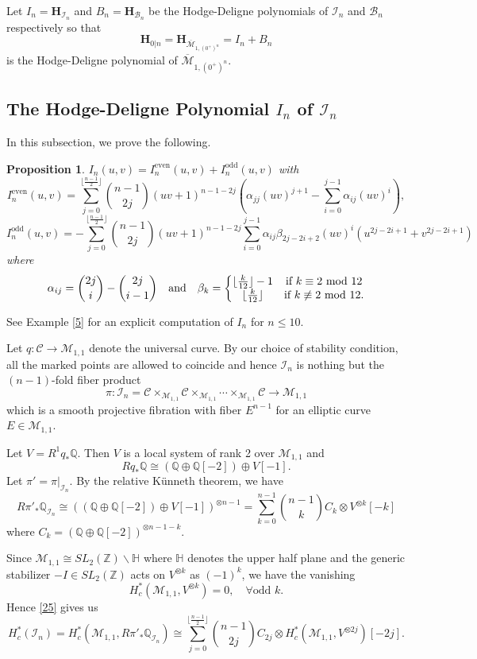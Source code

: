 \documentclass[11pt]{amsart}
\numberwithin{equation}{section}
\newtheorem{prop}[theo]{Proposition}
\theoremstyle{definition}
\newcommand{\QQ}{\mathbb{Q}}
\newcommand{\ZZ}{\mathbb{Z}}
\newcommand{\HH}{\mathbb{H}}
\newcommand{\bH}{\mathbf{H}}
\def\cB{{\mathcal B}}
\def\cC{{\mathcal C}}
\def\cM{{\mathcal M}}
\def\cI{{\mathcal I}}
\def\and{\quad{\rm and}\quad}
\def\lra{\longrightarrow }
\def\beq{\begin{equation}}
\def\eeq{\end{equation}}
\def\bcM{\overline{\cM}}
\begin{document}
Let $I_n=\bH_{\cI_n}$ and $B_n=\bH_{\cB_n}$ be the Hodge-Deligne polynomials of $\cI_n$ and $\cB_n$ respectively so that 
$$\bH_{0|n}= \bH_{\bcM_{1,(0^+)^n}}=I_n+B_n $$
is the Hodge-Deligne polynomial of $\bcM_{1,(0^+)^n}$.

\subsection{The Hodge-Deligne Polynomial $I_n$ of $\cI_n$} 
In this subsection, we prove the following. 
\begin{prop}\label{3} $I_n(u,v)=I_n^{\mathrm{even}}(u,v)+I^{\mathrm{odd}}_n(u,v)$ with  
\[
I_n^{\mathrm{even}}(u,v) = 
\sum_{j=0}^{\lfloor\frac{n-1}{2}\rfloor} \binom{n-1}{2j} (uv+1)^{n-1-2j} \left( \alpha_{jj}(uv)^{j+1} - \sum_{i=0}^{j-1} \alpha_{ij}(uv)^i\right),
\]
\[I_n^{\mathrm{odd}}(u,v)=-\sum_{j=0}^{\lfloor\frac{n-1}{2}\rfloor} \binom{n-1}{2j} (uv+1)^{n-1-2j}  \sum_{i=0}^{j-1} \alpha_{ij}\beta_{2j-2i+2}(uv)^i(u^{2j-2i+1}+v^{2j-2i+1})  \]
where \beq\label{21} \alpha_{ij}=\binom{2j}{i}-\binom{2j}{i-1}
\and 
\beta_k=\left\{\begin{matrix}  \lfloor \frac{k}{12}\rfloor -1 & \text{if } k\equiv 2 \text{ mod } 12\\
\lfloor \frac{k}{12}\rfloor & \text{if } k\not\equiv 2 \text{ mod } 12 .\end{matrix}\right.
\eeq
\end{prop}
See Example \ref{5} for an explicit computation of $I_n$ for $n\le 10$. 

\medskip

Let $q:\cC\to \cM_{1,1}$ denote the universal curve.
By our choice of stability condition, all the marked points are allowed to coincide and hence $\cI_n$ is nothing but the $(n-1)$-fold fiber product 
$$\pi:\cI_n=\cC\times_{\cM_{1,1}}\cC\times_{\cM_{1,1}}\cdots\times_{\cM_{1,1}}\cC\lra \cM_{1,1}$$
which is a smooth projective fibration with fiber $E^{n-1}$ for an elliptic curve $E\in \cM_{1,1}$.  

Let $V=R^1q_*\QQ$. Then $V$ is a local system of rank 2 over $\cM_{1,1}$ and $$Rq_*\QQ\cong (\QQ\oplus\QQ[-2])\oplus V[-1].$$ 
Let $\pi'=\pi|_{\cI_n}$. By the relative K\"unneth theorem, we have 
\beq\label{25}
R\pi'_*\QQ_{\cI_n}\cong ((\QQ\oplus \QQ[-2])\oplus V[-1])^{\otimes n-1}
=\sum_{k=0}^{n-1} \binom{n-1}{k} C_k\otimes V^{\otimes k}[-k]
\eeq
where $C_k=(\QQ\oplus \QQ[-2])^{\otimes n-1-k}$.

Since $\cM_{1,1}\cong SL_2(\ZZ)\backslash \HH$ where $\HH$ denotes the upper half plane and the generic stabilizer $-I\in SL_2(\ZZ)$ acts on $V^{\otimes k}$ as $(-1)^k$, we have the vanishing 
$$H^*_c(\cM_{1,1},V^{\otimes k})=0, \quad \forall \text{odd } k.$$  
Hence \eqref{25} gives us
\beq\label{26}
H^*_c(\cI_n)=H^*_c(\cM_{1,1},R\pi'_*\QQ_{\cI_n})
\cong \sum_{j=0}^{\lfloor \frac{n-1}{2}\rfloor} \binom{n-1}{2j}  C_{2j}\otimes H^*_c(\cM_{1,1},V^{\otimes 2j})[-2j].\eeq
\end{document}
